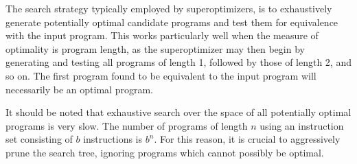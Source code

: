 \documentclass[a4paper,11pt]{kth-mag}
\begin{document}
The search strategy typically employed by superoptimizers, is to exhaustively generate potentially optimal candidate programs and test them for equivalence with the input program.
This works particularly well when the measure of optimality is program length, as the superoptimizer may then begin by generating and testing all programs of length 1, followed by those of length 2, and so on.
The first program found to be equivalent to the input program will necessarily be an optimal program.

It should be noted that exhaustive search over the space of all potentially optimal programs is very slow.
The number of programs of length $n$ using an instruction set consisting of $b$ instructions is $b^n$. %
For this reason, it is crucial to aggressively prune the search tree, ignoring programs which cannot possibly be optimal.

\nocite{*} %



\appendix
\addappheadtotoc
\end{document}
